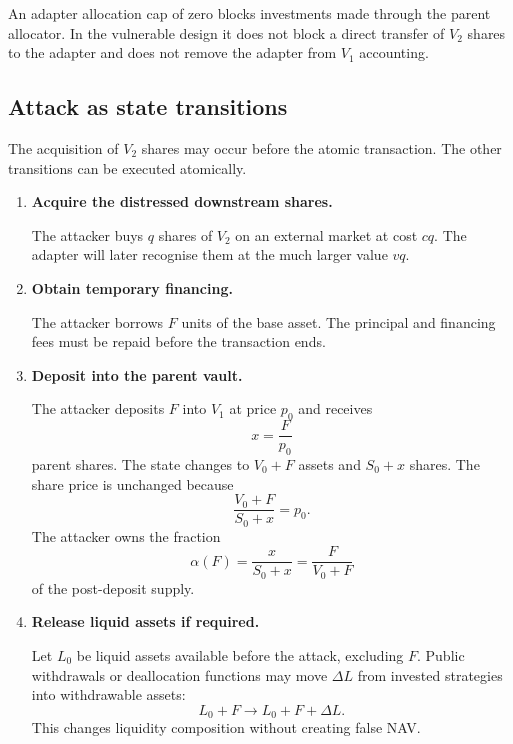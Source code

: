 \documentclass[11pt]{article}
\begin{document}
An adapter allocation cap of zero blocks investments made through the parent allocator.  In the vulnerable design it does not block a direct transfer of $V_2$ shares to the adapter and does not remove the adapter from $V_1$ accounting.

\subsection{Attack as state transitions}

The acquisition of $V_2$ shares may occur before the atomic transaction.  The other transitions can be executed atomically.

\begin{enumerate}
    \item \textbf{Acquire the distressed downstream shares.}

    The attacker buys $q$ shares of $V_2$ on an external market at cost $cq$.  The adapter will later recognise them at the much larger value $vq$.

    \item \textbf{Obtain temporary financing.}

    The attacker borrows $F$ units of the base asset.  The principal and financing fees must be repaid before the transaction ends.

    \item \textbf{Deposit into the parent vault.}

    The attacker deposits $F$ into $V_1$ at price $p_0$ and receives
    \begin{equation}
        x=\frac{F}{p_0}
    \end{equation}
    parent shares.  The state changes to $V_0+F$ assets and $S_0+x$ shares.  The share price is unchanged because
    \begin{equation}
        \frac{V_0+F}{S_0+x}=p_0.
    \end{equation}
    The attacker owns the fraction
    \begin{equation}
        \alpha(F)=\frac{x}{S_0+x}=\frac{F}{V_0+F}
    \end{equation}
    of the post-deposit supply.

    \item \textbf{Release liquid assets if required.}

    Let $L_0$ be liquid assets available before the attack, excluding $F$.  Public withdrawals or deallocation functions may move $\Delta L$ from invested strategies into withdrawable assets:
    \begin{equation}
        L_0+F\longrightarrow L_0+F+\Delta L.
    \end{equation}
    This changes liquidity composition without creating false NAV.


\end{enumerate}
\end{document}
